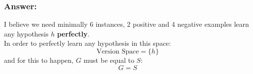 \documentclass{article}
\newcommand{\ap}[3]{\draw (#1,#2) node[scale=2] {#3};}
\newcommand{\mkrect}[5][black]{%
	\draw[#1,very thick] (#2,#3) rectangle (#4,#5);
}
\begin{document}
\begin{latin}
				\subsubsection*{Answer:}
				I believe we need minimally 6 instances, 2 positive and 4 negative examples learn any hypothesis $h$ \textbf{perfectly}.\\
				In order to perfectly learn any hypothesis in this space:
				$$
				\text{Version Space} = \{h\}
				$$
				and for this to happen, $G$ must be equal to $S$:
				$$
				G = S 
				$$
					\begin{figure}[h!]
						\centering
					\end{figure}	
	\end{latin}
	
\end{document}
